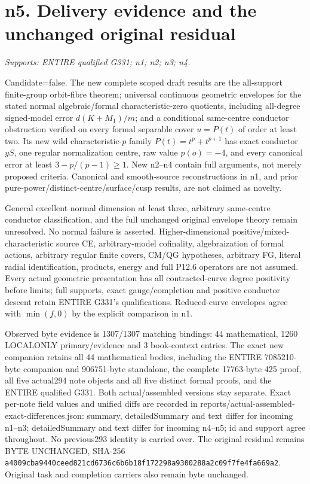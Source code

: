 \section{n5. Delivery evidence and the unchanged original residual}
\textit{Supports: ENTIRE qualified G331; n1; n2; n3; n4.}

Candidate=false. The new complete scoped draft results are the all-support
finite-group orbit-fibre theorem; universal continuous geometric envelopes
for the stated normal algebraic/formal characteristic-zero quotients,
including all-degree signed-model error $d(K+M_1)/m$; and a conditional
same-centre conductor obstruction verified on every formal separable cover
$u=P(t)$ of order at least two. Its new wild characteristic-$p$ family
$P(t)=t^p+t^{p+1}$ has exact conductor $yS$, one regular normalization
centre, raw value $p(o)=-4$, and every canonical error at least
$3-p/(p-1)\ge1$. New n2--n4 contain full arguments, not merely proposed
criteria. Canonical and smooth-source reconstructions in n1, and prior
pure-power/distinct-centre/surface/cusp results, are not claimed as novelty.

General excellent normal dimension at least three, arbitrary same-centre
conductor classification, and the full unchanged original envelope theory
remain unresolved. No normal failure is asserted. Higher-dimensional
positive/mixed-characteristic source CE, arbitrary-model cofinality,
algebraization of formal actions, arbitrary regular finite covers, CM/QG
hypotheses, arbitrary FG, literal radial identification, products, energy
and full P12.6 operators are not assumed. Every actual geometric
presentation has all contracted-curve degree positivity before limits;
full supports, exact gauge/completion and positive conductor descent retain
ENTIRE G331's qualifications. Reduced-curve envelopes agree with
$\min(f,0)$ by the explicit comparison in n1.

Observed byte evidence is 1307/1307 matching bindings: 44 mathematical,
1260 LOCALONLY primary/evidence and 3 book-context entries. The exact new
companion retains all 44 mathematical bodies, including the ENTIRE
7085210-byte companion and 906751-byte standalone, the complete 17763-byte
425 proof, all five actual294 note objects and all five distinct formal
proofs, and the ENTIRE qualified G331. Both actual/assembled versions stay
separate. Exact per-note field values and unified diffs are recorded in
reports/actual-assembled-exact-differences.json: summary, detailedSummary
and text differ for incoming n1--n3; detailedSummary and text differ for
incoming n4--n5; id and support agree throughout. No previous293 identity
is carried over. The original residual remains BYTE UNCHANGED, SHA-256
\texttt{a4009cba9440ceed821cd6736c6b6b18f172298a9300288a2c09f7fe4fa669a2}.
Original task and completion carriers also remain byte unchanged.

